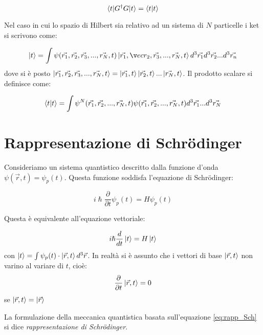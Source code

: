\begin{equation}
\braket{t|G^{\dag}G|t}=\braket{t|t}
\end{equation}

Nel caso in cui lo spazio di Hilbert sia relativo ad un sistema di $N$ 
particelle i ket si scrivono come:

\begin{equation}
\ket{t}=\int\psi(\vec{r_1},\vec{r_2},\vec{r_3},...,\vec{r_N},t)\ket{\vec{r_1},\v
ec{r_2},\vec{r_3},...,\vec{r_N},t}d^3\vec{r_1}d^3\vec{r_2}...d^3\vec{r_n}
\end{equation}
dove si è posto 
$\ket{\vec{r_1},\vec{r_2},\vec{r_3},...,\vec{r_N},t}=\ket{\vec{r_1},t}\ket{\vec{
r_2},t}...\ket{\vec{r_N},t}$.
Il prodotto scalare si definisce come:

\begin{equation}
\braket{t|t}=\int\psi^N(\vec{r_1},\vec{r_2},...,\vec{r_N},t)\psi(\vec{r_1},\vec{
r_2},...,\vec{r_N},t)d^3\vec{r_1}...d^3\vec{r_N}
\end{equation}


\section{Rappresentazione di Schr\"{o}dinger}
Consideriamo un sistema quantistico descritto dalla funzione d'onda
$\psi(\vec{r},t)=\psi_{p}(t)$. Questa funzione soddisfa l'equazione di
Schr\"{o}dinger:

\begin{equation}
i\hslash\frac{\partial}{\partial t}\psi_{p}(t)=H\psi_{p}(t)
\end{equation}

Questa è equivalente all'equazione vettoriale:

\begin{equation}
i\hslash\frac{d}{dt}\ket{t}=H\ket{t}
\label{eq:rapp_Sch}
\end{equation}
con $\ket{t}=\int\psi_{p}(t)\cdot \ket{\vec{r},t}d^{3}\vec{r}$.
In realtà si è assunto che i vettori di base $\ket{\vec{r},t}$ non varino al
variare di $t$, cioè:
\begin{equation}
\frac{\partial}{\partial t}\ket{\vec{r},t}=0 
\end{equation}
se $\ket{\vec{r},t}=\ket{\vec{r}}$

La formulazione della meccanica quantistica basata sull'equazione
\eqref{eq:rapp_Sch} si dice \textit{rappresentazione di Schr\"{o}dinger}.

